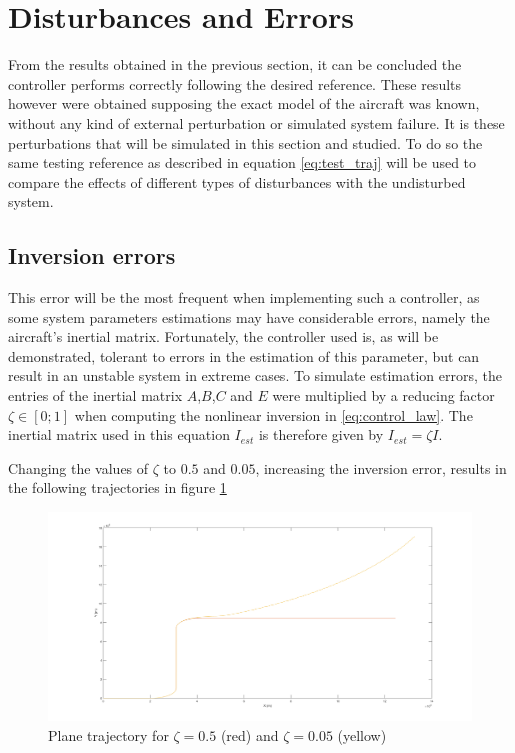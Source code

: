 \section{Disturbances and Errors}
\label{section:results/disturbances_errors}

From the results obtained in the previous section, it can be concluded the controller performs correctly following the desired reference. These results however were obtained supposing the exact model of the aircraft was known, without any kind of external perturbation or simulated system failure. It is these perturbations that will be simulated in this section and studied. To do so the same testing reference as described in equation \ref{eq:test_traj} will be used to compare the effects of different types of disturbances with the undisturbed system. 

\subsection{Inversion errors}

This error will be the most frequent when implementing such a controller, as some system parameters estimations may have considerable errors, namely the aircraft's inertial matrix. Fortunately, the controller used is, as will be demonstrated, tolerant to errors in the estimation of this parameter, but can result in an unstable system in extreme cases. To simulate estimation errors, the entries of the inertial matrix $A$,$B$,$C$ and $E$ were multiplied by a reducing factor $\zeta \in [0;1]$ when computing the nonlinear inversion in \ref{eq:control_law}. The inertial matrix used in this equation $I_{est}$ is therefore given by $I_{est} = \zeta I$.

Changing the values of $\zeta$ to $0.5$ and $0.05$, increasing the inversion error, results in the following trajectories in figure \ref{fig:inversion_error}

\begin{figure}[H]
\centering
\includegraphics[width=\textwidth]{Figures/Results/inversion_error.png}
\caption[Plane trajectory with inertia estimation errors]{Plane trajectory for $\zeta = 0.5$ (red) and $\zeta= 0.05$ (yellow)}
\label{fig:inversion_error}
\end{figure}

